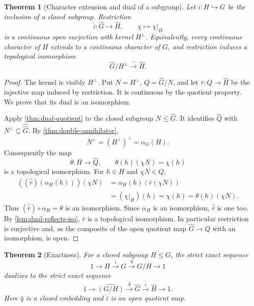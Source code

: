 \documentclass[11pt]{article}
\newtheorem{theorem}{Theorem}[section]
\theoremstyle{definition}
\theoremstyle{remark}
\newcommand{\dual}[1]{\widehat{#1}}
\newcommand{\bidual}[1]{\widehat{\widehat{#1}}}
\begin{document}
\begin{theorem}[Character extension and dual of a subgroup]
\label{thm:character-extension}
Let $i:H\hookrightarrow G$ be the inclusion of a closed subgroup.  Restriction
\[
  \dual i:\dual G\longrightarrow\dual H,
  \qquad\chi\longmapsto\chi|_H
\]
is a continuous open surjection with kernel $H^\perp$.  Equivalently, every continuous
character of $H$ extends to a continuous character of $G$, and restriction induces a
topological isomorphism
\begin{equation}
  \dual G/H^\perp\xrightarrow{\ \sim\ }\dual H.
  \label{eq:dual-subgroup}
\end{equation}
\end{theorem}

\begin{proof}
The kernel is visibly $H^\perp$.  Put $N=H^\perp$, $Q=\dual G/N$, and let
$\bar r:Q\to\dual H$ be the injective map induced by restriction.  It is continuous by
the quotient property.  We prove that its dual is an isomorphism.

Apply \cref{thm:dual-quotient} to the closed subgroup $N\leq\dual G$.  It identifies
$\dual Q$ with $N^\perp\subseteq\bidual G$.  By
\cref{thm:double-annihilator},
\[
  N^\perp=(H^\perp)^\perp=\alpha_G(H).
\]
Consequently the map
\[
 \theta:H\longrightarrow\dual Q,
 \qquad \theta(h)(\chi N)=\chi(h)
\]
is a topological isomorphism.  For $h\in H$ and $\chi N\in Q$,
\begin{align*}
 ((\dual{\bar r})(\alpha_H(h)))(\chi N)
 &=\alpha_H(h)(\bar r(\chi N))\\
 &=(\chi|_H)(h)=\chi(h)=\theta(h)(\chi N).
\end{align*}
Thus $(\dual{\bar r})\circ\alpha_H=\theta$ is an isomorphism.  Since $\alpha_H$ is an
isomorphism, $\dual{\bar r}$ is one too.  By
\cref{lem:dual-reflects-iso}, $\bar r$ is a topological isomorphism.  In particular
restriction is surjective and, as the composite of the open quotient map
$\dual G\to Q$ with an isomorphism, is open.
\end{proof}

\begin{theorem}[Exactness]
\label{thm:exactness}
For a closed subgroup $H\leq G$, the strict exact sequence
\[
  1\longrightarrow H\xrightarrow{i}G\xrightarrow{q}G/H\longrightarrow1
\]
dualizes to the strict exact sequence
\begin{equation}
  1\longrightarrow\dual{(G/H)}
  \xrightarrow{\dual q}\dual G
  \xrightarrow{\dual i}\dual H\longrightarrow1.
  \label{eq:dual-exact-sequence}
\end{equation}
Here $\dual q$ is a closed embedding and $\dual i$ is an open quotient map.
\end{theorem}
\end{document}
